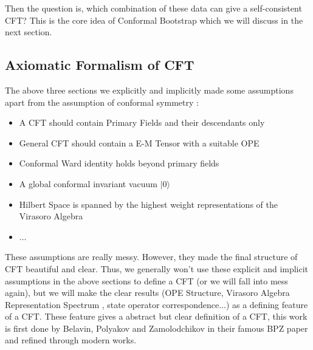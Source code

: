 Then the question is, which combination of these data can give a
self-consistent CFT? This is the core idea of Conformal Bootstrap
which we will discuss in the next section.

\subsection{Axiomatic Formalism of CFT}

The above three sections we explicitly and implicitly made some
assumptions apart from the assumption of conformal symmetry :
\begin{itemize}
  \item A CFT should contain Primary Fields and their descendants only
  \item General CFT should contain a E-M Tensor with a suitable OPE
  \item Conformal Ward identity holds beyond primary fields
  \item A global conformal invariant vacuum $ |0\rangle $
  \item Hilbert Space is spanned by the highest weight
    representations of the Virasoro Algebra
  \item ...
\end{itemize}
These assumptions are really messy. However, they made the final
structure of CFT beautiful and clear. Thus, we generally won't use
these explicit and implicit assumptions in the above sections to
define a CFT (or we will fall into mess again), but we will make the
clear results (OPE Structure, Virasoro Algebra Representation
Spectrum , state operator correspondence...) as a defining feature of
a CFT. These feature gives a abstract but clear definition of a CFT,
this work is first done by Belavin, Polyakov and Zamolodchikov in
their famous BPZ paper and refined through modern works.
